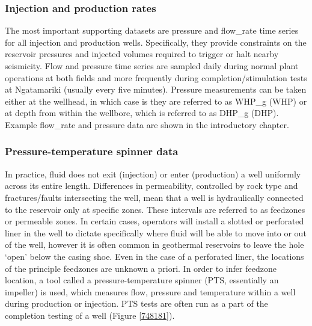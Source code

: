 \subsubsection{Injection and production rates}
The most important supporting datasets are pressure and \gls{flow_rate} time series for all injection and production wells. Specifically, they provide constraints on the reservoir pressures and injected volumes required to trigger or halt nearby seismicity. Flow and pressure time series are sampled daily during normal plant operations at both fields and more frequently during completion\slash{}\gls{stimulation} tests at Ngatamariki (usually every five minutes). Pressure measurements can be taken either at the wellhead, in which case is they are referred to as \gls{WHP_g} (\acrshort{WHP}) or at depth from within the wellbore, which is referred to as \gls{DHP_g} (\acrshort{DHP}). Example \gls{flow_rate} and pressure data are shown in the introductory chapter.

\subsubsection{Pressure-temperature spinner data}
In practice, fluid does not exit (injection) or enter (production) a well uniformly across its entire length. Differences in \gls{permeability}, controlled by rock type and fractures\slash{faults} intersecting the well, mean that a well is hydraulically connected to the reservoir only at specific zones. These intervals are referred to as \glspl{feedzone} or permeable zones. In certain cases, operators will install a slotted or perforated liner in the well to dictate specifically where fluid will be able to move into or out of the well, however it is often common in geothermal reservoirs to leave the hole `open' below the casing shoe. Even in the case of a perforated liner, the locations of the principle \glspl{feedzone} are unknown a priori. In order to infer \gls{feedzone} location, a tool called a pressure-temperature spinner (\acrshort{PTS}, essentially an impeller) is used, which measures flow, pressure and temperature within a well during production or injection. \acrshort{PTS} tests are often run as a part of the completion testing of a well (Figure \ref{748181}).

